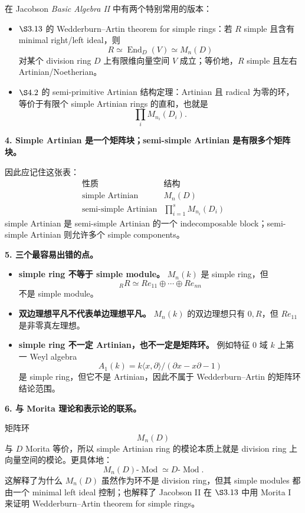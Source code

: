 \documentclass[a4paper]{ctexart}
\theoremstyle{definition}
\theoremstyle{analysis}
\theoremstyle{plain}
\begin{document}
在 Jacobson \textit{Basic Algebra II} 中有两个特别常用的版本：
\begin{itemize}
  \item \(\S 3.13\) 的 Wedderburn--Artin theorem for simple rings：若 \(R\) simple 且含有 minimal right/left ideal，则
  \[
    R\simeq \operatorname{End}_D(V)\simeq M_n(D)
  \]
  对某个 division ring \(D\) 上有限维向量空间 \(V\) 成立；等价地，\(R\) simple 且左右 Artinian/Noetherian。
  \item \(\S 4.2\) 的 semi-primitive Artinian 结构定理：Artinian 且 radical 为零的环，等价于有限个 simple Artinian rings 的直和，也就是
  \[
    \prod_i M_{n_i}(D_i).
  \]
\end{itemize}

\medskip

\textbf{4. Simple Artinian 是一个矩阵块；semi-simple Artinian 是有限多个矩阵块。}

因此应记住这张表：
\[
\begin{array}{c|c}
  \text{性质} & \text{结构}\\ \hline
  \text{simple Artinian} & M_n(D)\\
  \text{semi-simple Artinian} & \prod_{i=1}^s M_{n_i}(D_i)
\end{array}
\]
simple Artinian 是 semi-simple Artinian 的一个 indecomposable block；semi-simple Artinian 则允许多个 simple components。

\medskip

\textbf{5. 三个最容易出错的点。}

\begin{itemize}
  \item \textbf{simple ring 不等于 simple module。}
  \(M_n(k)\) 是 simple ring，但
  \[
    {}_RR\simeq Re_{11}\oplus\cdots\oplus Re_{nn}
  \]
  不是 simple module。
  \item \textbf{双边理想平凡不代表单边理想平凡。}
  \(M_n(k)\) 的双边理想只有 \(0,R\)，但 \(Re_{11}\) 是非零真左理想。
  \item \textbf{simple ring 不一定 Artinian，也不一定是矩阵环。}
  例如特征 \(0\) 域 \(k\) 上第一 Weyl algebra
  \[
    A_1(k)=k\langle x,\partial\rangle/(\partial x-x\partial-1)
  \]
  是 simple ring，但它不是 Artinian，因此不属于 Wedderburn--Artin 的矩阵环结论范围。
\end{itemize}

\medskip

\textbf{6. 与 Morita 理论和表示论的联系。}

矩阵环
\[
  M_n(D)
\]
与 \(D\) Morita 等价，所以 simple Artinian ring 的模论本质上就是 division ring 上向量空间的模论。更具体地：
\[
  M_n(D)\text{-}\operatorname{Mod}
  \simeq
  D\text{-}\operatorname{Mod}.
\]
这解释了为什么 \(M_n(D)\) 虽然作为环不是 division ring，但其 simple modules 都由一个 minimal left ideal 控制；也解释了 Jacobson II 在 \(\S 3.13\) 中用 Morita I 来证明 Wedderburn--Artin theorem for simple rings。
\end{document}
